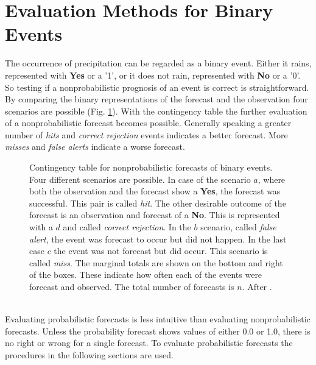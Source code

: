 \documentclass[11pt,twoside,a4paper,fleqn,x11names]{report}
\numberwithin{equation}{chapter}
\numberwithin{figure}{chapter}
\numberwithin{table}{chapter}
\begin{document}
\section{Evaluation Methods for Binary Events}
The occurrence of precipitation can be regarded as a binary event. Either it rains, represented with \textbf{Yes} or a '1', or it does not rain, represented with \textbf{No} or a '0'. So testing if a nonprobabilistic prognosis of an event is correct is straightforward. By comparing the binary representations of the forecast and the observation four scenarios are possible (Fig. \ref{fig:contingency}). With the contingency table the further evaluation of a nonprobabilistic forecast becomes possible. Generally speaking a greater number of \textit{hits} and \textit{correct rejection} events indicates a better forecast. More \textit{misses} and \textit{false alerts} indicate a worse forecast.
\begin{figure}[!htbp]
\centering
	\caption[Contingency Table for Nonprobabilistic Forecasts of Binary Events]{Contingency table for nonprobabilistic forecasts of binary events. Four different scenarios are possible. In case of the scenario $a$, where both the observation and the forecast show a \textbf{Yes}, the forecast was successful. This pair is called \textit{hit}. The other desirable outcome of the forecast is an observation and forecast of a \textbf{No}. This is represented with a $d$ and called \textit{correct rejection}. In the $b$ scenario, called \textit{false alert}, the event was forecast to occur but did not happen. In the last case $c$ the event was not forecast but did occur. This scenario is called \textit{miss}. The marginal totals are shown on the bottom and right of the boxes. These indicate how often each of the events were forecast and observed. The total number of forecasts is $n$. After \cite{Wilks}.}
	\label{fig:contingency}
\end{figure}
\\
Evaluating probabilistic forecasts is less intuitive than evaluating nonprobabilistic forecasts. Unless the probability forecast shows values of either 0.0 or 1.0, there is no right or wrong for a single forecast. To evaluate probabilistic forecasts the procedures in the following sections are used.
\label{subsec:eval}
\citep{Wilks}
\end{document}
